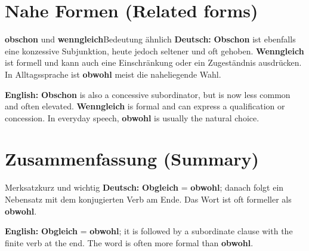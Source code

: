 \documentclass[a4paper,11pt]{article}
\newcommand{\GermanText}[1]{\textbf{Deutsch: }#1\par}\newcommand{\EnglishText}[1]{{\small\color{SoftGray}\textbf{English: }#1\par}}\newcommand{\ExampleItem}[2]{\item \textbf{#1}\\{\small\color{SoftGray}#2}}
\begin{document}
\section{Nahe Formen \textnormal{(Related forms)}}
\begin{grammarentry}{\textbf{obschon} und \textbf{wenngleich}}{Bedeutung ähnlich}
\GermanText{\textbf{Obschon} ist ebenfalls eine konzessive Subjunktion, heute jedoch seltener und oft gehoben. \textbf{Wenngleich} ist formell und kann auch eine Einschränkung oder ein Zugeständnis ausdrücken. In Alltagssprache ist \textbf{obwohl} meist die naheliegende Wahl.}
\EnglishText{\textbf{Obschon} is also a concessive subordinator, but is now less common and often elevated. \textbf{Wenngleich} is formal and can express a qualification or concession. In everyday speech, \textbf{obwohl} is usually the natural choice.}
\end{grammarentry}

\section{Zusammenfassung \textnormal{(Summary)}}
\begin{grammarentry}{Merksatz}{kurz und wichtig}
\GermanText{\textbf{Obgleich} = \textbf{obwohl}; danach folgt ein Nebensatz mit dem konjugierten Verb am Ende. Das Wort ist oft formeller als \textbf{obwohl}.}
\EnglishText{\textbf{Obgleich} = \textbf{obwohl}; it is followed by a subordinate clause with the finite verb at the end. The word is often more formal than \textbf{obwohl}.}
\end{grammarentry}
\end{document}
